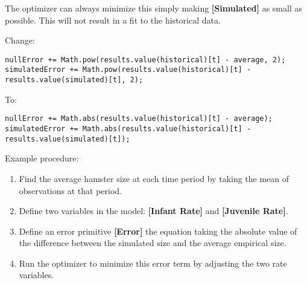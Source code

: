 \documentclass[]{memoir}
\newcommand{\p}[1]{\textbf{{[}#1{]}}}
\begin{document}

The optimizer can always minimize this simply making \p{Simulated} as
small as possible. This will not result in a fit to the historical data.


Change:

\begin{lstlisting}
nullError += Math.pow(results.value(historical)[t] - average, 2);
simulatedError += Math.pow(results.value(historical)[t] - results.value(simulated)[t], 2);
\end{lstlisting}

To:

\begin{lstlisting}
nullError += Math.abs(results.value(historical)[t] - average);
simulatedError += Math.abs(results.value(historical)[t] - results.value(simulated)[t]);
\end{lstlisting}


Example procedure:

\begin{enumerate}
\def\labelenumi{\arabic{enumi}.}
\itemsep1pt\parskip0pt
\item
  Find the average hamster size at each time period by taking the mean
  of observations at that period.
\item
  Define two variables in the model: \p{Infant Rate} and
  \p{Juvenile Rate}.
\item
  Define an error primitive \p{Error} the equation taking the absolute
  value of the difference between the simulated size and the average
  empirical size.
\item
  Run the optimizer to minimize this error term by adjusting the two
  rate variables.
\end{enumerate}
\end{document}

